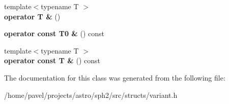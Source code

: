 \begin{DoxyCompactItemize}
{\footnotesize template$<$typename T $>$ }\\{\bfseries operator T \&} ()
\item 
\hypertarget{classUnion_3_01T0_00_01T1_00_01TArgs_8_8_8_01_4_a675c63267c4c6f7f514f69ff97f90f4e}{}\label{classUnion_3_01T0_00_01T1_00_01TArgs_8_8_8_01_4_a675c63267c4c6f7f514f69ff97f90f4e} 
{\bfseries operator const T0 \&} () const
\item 
\hypertarget{classUnion_3_01T0_00_01T1_00_01TArgs_8_8_8_01_4_a3f9af8b9d329914b5a91d2c2032d0243}{}\label{classUnion_3_01T0_00_01T1_00_01TArgs_8_8_8_01_4_a3f9af8b9d329914b5a91d2c2032d0243} 
{\footnotesize template$<$typename T $>$ }\\{\bfseries operator const T \&} () const
\end{DoxyCompactItemize}


The documentation for this class was generated from the following file\+:\begin{DoxyCompactItemize}
\item 
/home/pavel/projects/astro/sph2/src/structs/variant.\+h\end{DoxyCompactItemize}
